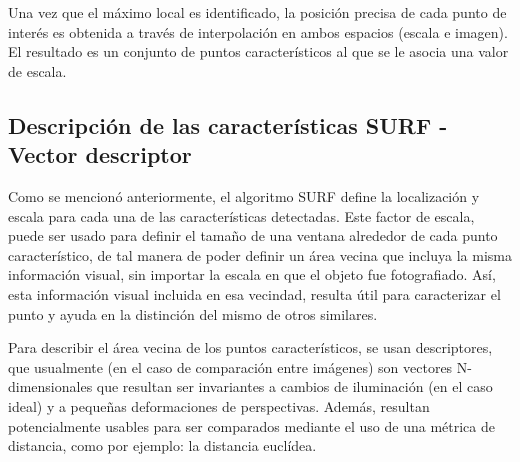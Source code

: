 \documentclass[a4paper,11pt,spanish]{article}
\begin{document}
Una vez que el máximo local es identificado, la posición precisa de cada punto de interés es obtenida a través de interpolación en ambos espacios (escala e imagen). El resultado es un conjunto de puntos característicos %
al que se le asocia una valor de escala.

\bigskip
\bigskip
\bigskip
\subsection{Descripción de las características SURF - Vector descriptor}
Como se mencionó anteriormente, el algoritmo SURF define la localización y escala para cada una de las características detectadas. Este factor de escala, puede ser usado para definir el tamaño de una ventana alrededor de cada punto característico, de tal manera de poder definir un área vecina que incluya la misma información visual, sin importar la escala en que el objeto fue fotografiado. Así, esta información visual incluida en esa vecindad, resulta útil para caracterizar el punto y ayuda en la distinción del mismo de otros similares.

Para describir el área vecina de los puntos característicos, se usan descriptores, que usualmente (en el caso de comparación entre imágenes) son vectores N-dimensionales que resultan ser invariantes a cambios de iluminación (en el caso ideal) y a pequeñas deformaciones de perspectivas. Además, resultan potencialmente usables para ser comparados mediante el uso de una métrica de distancia, como por ejemplo: la distancia euclídea.
\end{document}
